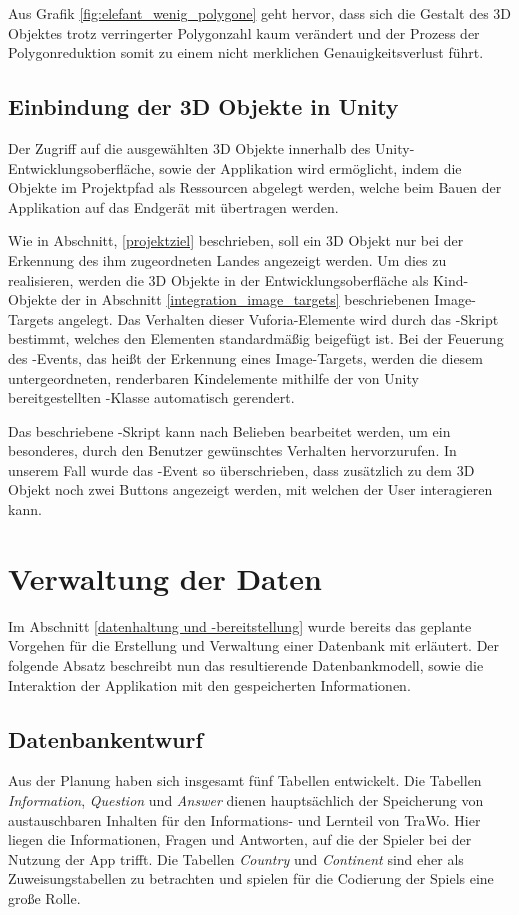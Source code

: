 Aus Grafik \ref{fig:elefant_wenig_polygone} geht hervor, dass sich die Gestalt des 3D Objektes trotz verringerter Polygonzahl kaum verändert und der Prozess der Polygonreduktion somit zu einem nicht merklichen Genauigkeitsverlust führt.
\subsection{Einbindung der 3D Objekte in Unity}\label{einbindung_3D_objekte}
Der Zugriff auf die ausgewählten 3D Objekte innerhalb des Unity-Entwicklungsoberfläche, sowie der Applikation wird ermöglicht, indem die Objekte im Projektpfad als Ressourcen abgelegt werden, welche beim Bauen der Applikation auf das Endgerät mit übertragen werden. 

Wie in Abschnitt, \ref{projektziel} beschrieben, soll ein 3D Objekt nur bei der Erkennung des ihm zugeordneten Landes angezeigt werden.
Um dies zu realisieren, werden die 3D Objekte in der Entwicklungsoberfläche als Kind-Objekte der in Abschnitt \ref{integration_image_targets} beschriebenen Image-Targets angelegt.
Das Verhalten dieser Vuforia-Elemente wird durch das -Skript bestimmt, welches den Elementen standardmäßig beigefügt ist. 
Bei der Feuerung des -Events, das heißt der Erkennung eines Image-Targets, werden die diesem untergeordneten, renderbaren Kindelemente mithilfe der von Unity bereitgestellten -Klasse automatisch gerendert.

Das beschriebene -Skript kann nach Belieben bearbeitet werden, um ein besonderes, durch den Benutzer gewünschtes Verhalten hervorzurufen.
In unserem Fall wurde das -Event so überschrieben, dass zusätzlich zu dem 3D Objekt noch zwei Buttons angezeigt werden, mit welchen der User interagieren kann.

\section{Verwaltung der Daten}
Im Abschnitt \ref{datenhaltung und -bereitstellung} wurde bereits das geplante Vorgehen für die Erstellung und Verwaltung einer Datenbank mit  erläutert. Der folgende Absatz beschreibt nun das resultierende Datenbankmodell, sowie die Interaktion der Applikation mit den gespeicherten Informationen.
\subsection{Datenbankentwurf}\label{datenbankentwurf}
Aus der Planung haben sich insgesamt fünf Tabellen entwickelt. Die Tabellen \textit{Information}, \textit{Question} und \textit{Answer} dienen hauptsächlich der Speicherung von austauschbaren Inhalten für den Informations- und Lernteil von TraWo. Hier liegen die Informationen, Fragen und Antworten, auf die der Spieler bei der Nutzung der App trifft. Die Tabellen \textit{Country} und \textit{Continent} sind eher als Zuweisungstabellen zu betrachten und spielen für die Codierung der Spiels eine große Rolle.

